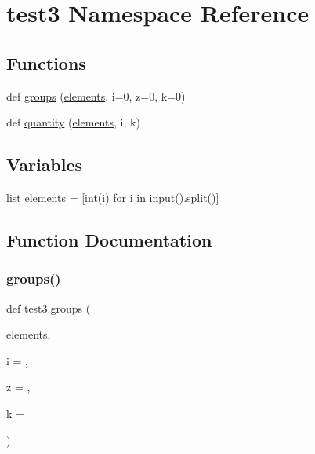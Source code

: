 \hypertarget{namespacetest3}{}\section{test3 Namespace Reference}
\label{namespacetest3}
\subsection*{Functions}
\begin{DoxyCompactItemize}
\item 
def \hyperlink{namespacetest3_a543df88ee0551783cec7212ebb7164a1}{groups} (\hyperlink{namespacetest3_a0b4b1cdfeb38dc608859e69d05afefb1}{elements}, i=0, z=0, k=0)
\item 
def \hyperlink{namespacetest3_a06ddebe2e58ee64b079084adb59637f1}{quantity} (\hyperlink{namespacetest3_a0b4b1cdfeb38dc608859e69d05afefb1}{elements}, i, k)
\end{DoxyCompactItemize}
\subsection*{Variables}
\begin{DoxyCompactItemize}
\item 
list \hyperlink{namespacetest3_a0b4b1cdfeb38dc608859e69d05afefb1}{elements} = \mbox{[}int(i) for i in input().split()\mbox{]}
\end{DoxyCompactItemize}


\subsection{Function Documentation}
\mbox{\label{namespacetest3_a543df88ee0551783cec7212ebb7164a1}} 
\subsubsection{\texorpdfstring{groups()}{groups()}}
{\footnotesize\ttfamily def test3.\+groups (\begin{DoxyParamCaption}\item[{}]{elements,  }\item[{}]{i = {},  }\item[{}]{z = {},  }\item[{}]{k = {} }\end{DoxyParamCaption})}


